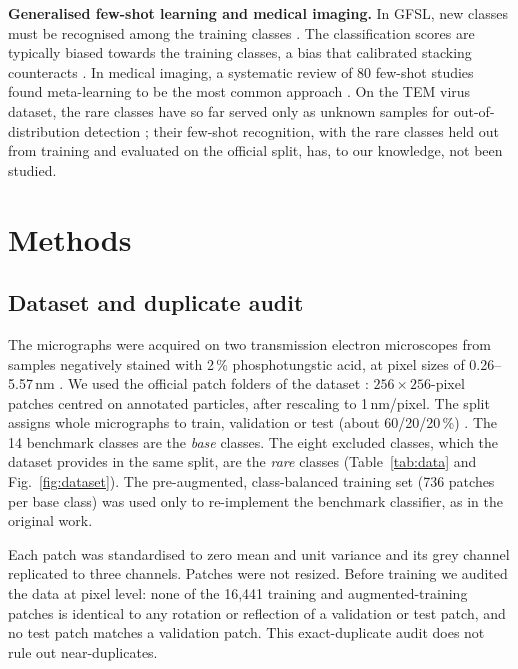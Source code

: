 \documentclass[preprint,review,12pt]{elsarticle}
\begin{document}
\textbf{Generalised few-shot learning and medical imaging.} In GFSL, new classes must be recognised among the training classes \cite{GK18}. The classification scores are typically biased towards the training classes, a bias that calibrated stacking counteracts \cite{Cha16}. In medical imaging, a systematic review of 80 few-shot studies found meta-learning to be the most common approach \cite{PC23}. On the TEM virus dataset, the rare classes have so far served only as unknown samples for out-of-distribution detection \cite{MS22}; their few-shot recognition, with the rare classes held out from training and evaluated on the official split, has, to our knowledge, not been studied.

\section{Methods}
\label{sec:methods}

\subsection{Dataset and duplicate audit}
\label{sec:data}

The micrographs were acquired on two transmission electron microscopes from samples negatively stained with 2\,\% phosphotungstic acid, at pixel sizes of 0.26--5.57\,nm \cite{MS21data}. We used the official patch folders of the dataset \cite{MS21data}: $256\times256$-pixel patches centred on annotated particles, after rescaling to 1\,nm/pixel. The split assigns whole micrographs to train, validation or test (about 60/20/20\,\%) \cite{MS21}. The 14 benchmark classes are the \emph{base} classes. The eight excluded classes, which the dataset provides in the same split, are the \emph{rare} classes (Table~\ref{tab:data} and Fig.~\ref{fig:dataset}). The pre-augmented, class-balanced training set (736 patches per base class) was used only to re-implement the benchmark classifier, as in the original work.

Each patch was standardised to zero mean and unit variance \cite{MS21} and its grey channel replicated to three channels. Patches were not resized. Before training we audited the data at pixel level: none of the 16,441 training and augmented-training patches is identical to any rotation or reflection of a validation or test patch, and no test patch matches a validation patch. This exact-duplicate audit does not rule out near-duplicates.
\end{document}
